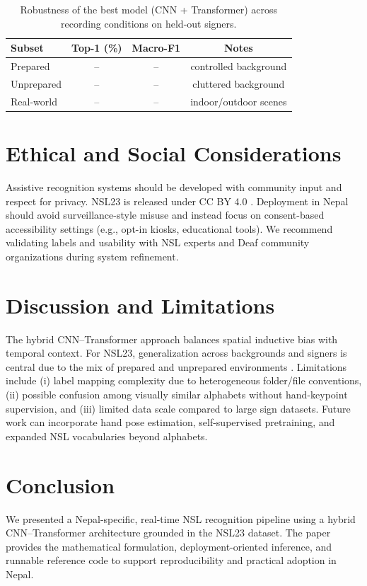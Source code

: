 \documentclass[conference]{IEEEtran}
\begin{document}
\begin{table}[t]
\centering
\caption{Robustness of the best model (CNN + Transformer) across recording conditions on held-out signers.}
\label{tab:robustness}
\begin{tabular}{lccc}
\toprule
Subset & Top-1 (\%) & Macro-F1 & Notes \\
\midrule
Prepared & -- & -- & controlled background \\
Unprepared & -- & -- & cluttered background \\
Real-world & -- & -- & indoor/outdoor scenes \\
\bottomrule
\end{tabular}
\end{table}

\section{Ethical and Social Considerations}
Assistive recognition systems should be developed with community input and respect for privacy. NSL23 is released under CC BY 4.0 \cite{zenodo_nsl23}. Deployment in Nepal should avoid surveillance-style misuse and instead focus on consent-based accessibility settings (e.g., opt-in kiosks, educational tools). We recommend validating labels and usability with NSL experts and Deaf community organizations during system refinement.

\section{Discussion and Limitations}
The hybrid CNN--Transformer approach balances spatial inductive bias with temporal context. For NSL23, generalization across backgrounds and signers is central due to the mix of prepared and unprepared environments \cite{sunuwar2024dib,zenodo_nsl23}. Limitations include (i) label mapping complexity due to heterogeneous folder/file conventions, (ii) possible confusion among visually similar alphabets without hand-keypoint supervision, and (iii) limited data scale compared to large sign datasets. Future work can incorporate hand pose estimation, self-supervised pretraining, and expanded NSL vocabularies beyond alphabets.

\section{Conclusion}
We presented a Nepal-specific, real-time NSL recognition pipeline using a hybrid CNN--Transformer architecture grounded in the NSL23 dataset. The paper provides the mathematical formulation, deployment-oriented inference, and runnable reference code to support reproducibility and practical adoption in Nepal.
\end{document}
